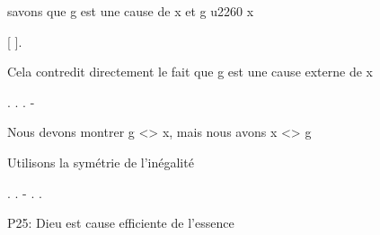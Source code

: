 \documentclass[10pt]{report}
\begin{document}
\begin{coqdoccode}
\begin{coqdoccomment}
savons\coqdocindent{0.50em}
que\coqdocindent{0.50em}
g\coqdocindent{0.50em}
est\coqdocindent{0.50em}
une\coqdocindent{0.50em}
cause\coqdocindent{0.50em}
de\coqdocindent{0.50em}
x\coqdocindent{0.50em}
et\coqdocindent{0.50em}
g\coqdocindent{0.50em}
u2260\coqdocindent{0.50em}
x\coqdocindent{0.50em}
\end{coqdoccomment}
\coqdoceol
\coqdocindent{1.00em}
   [\coqdocvar{\_} ].\coqdoceol
\coqdocemptyline
\coqdocindent{1.00em}
\begin{coqdoccomment}
\coqdocindent{0.50em}
Cela\coqdocindent{0.50em}
contredit\coqdocindent{0.50em}
directement\coqdocindent{0.50em}
le\coqdocindent{0.50em}
fait\coqdocindent{0.50em}
que\coqdocindent{0.50em}
g\coqdocindent{0.50em}
est\coqdocindent{0.50em}
une\coqdocindent{0.50em}
cause\coqdocindent{0.50em}
externe\coqdocindent{0.50em}
de\coqdocindent{0.50em}
x\coqdocindent{0.50em}
\end{coqdoccomment}
\coqdoceol
\coqdocindent{1.00em}
 .\coqdoceol
\coqdocindent{1.00em}
\coqdoctac{\ensuremath{\exists}} .\coqdoceol
\coqdocindent{1.00em}
.\coqdoceol
\coqdocindent{1.00em}
- \begin{coqdoccomment}
\coqdocindent{0.50em}
Nous\coqdocindent{0.50em}
devons\coqdocindent{0.50em}
montrer\coqdocindent{0.50em}
g\coqdocindent{0.50em}
<>\coqdocindent{0.50em}
x,\coqdocindent{0.50em}
mais\coqdocindent{0.50em}
nous\coqdocindent{0.50em}
avons\coqdocindent{0.50em}
x\coqdocindent{0.50em}
<>\coqdocindent{0.50em}
g\coqdocindent{0.50em}
\end{coqdoccomment}
\coqdoceol
\coqdocindent{2.00em}
\begin{coqdoccomment}
\coqdocindent{0.50em}
Utilisons\coqdocindent{0.50em}
la\coqdocindent{0.50em}
symétrie\coqdocindent{0.50em}
de\coqdocindent{0.50em}
l'inégalité\coqdocindent{0.50em}
\end{coqdoccomment}
\coqdoceol
\coqdocindent{2.00em}
 .  .\coqdoceol
\coqdocindent{1.00em}
-  .\coqdoceol
\coqdocnoindent
{}.\coqdoceol
\coqdocemptyline
\coqdocnoindent
\begin{coqdoccomment}
\coqdocindent{0.50em}
P25:\coqdocindent{0.50em}
Dieu\coqdocindent{0.50em}
est\coqdocindent{0.50em}
cause\coqdocindent{0.50em}
efficiente\coqdocindent{0.50em}
de\coqdocindent{0.50em}
l'essence\coqdocindent{0.50em}

\end{coqdoccomment}
\end{coqdoccode}
\end{document}
